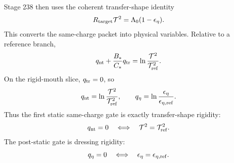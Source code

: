 Stage 238 then uses the coherent transfer-shape identity
\begin{equation}
\label{eq:app-part07-transfer-shape-identity}
R_{\rm target}\mathcal T^2=\Lambda_0(1-\epsilon_\eta).
\end{equation}
This converts the same-charge packet into physical variables.  Relative to a reference branch,
\begin{equation}
\label{eq:app-part07-qnt-transfer-shape}
q_{\rm nt}+\frac{B_*}{C_*}q_{\rm tr}
=
\ln\frac{\mathcal T^2}{\mathcal T_{\rm ref}^2}.
\end{equation}
On the rigid-mouth slice, \(q_{\rm tr}=0\), so
\begin{equation}
\label{eq:app-part07-rm-qnt-qeta-transfer}
q_{\rm nt}=\ln\frac{\mathcal T^2}{\mathcal T_{\rm ref}^2},
\qquad
q_\eta=\ln\frac{\epsilon_\eta}{\epsilon_{\eta,\rm ref}}.
\end{equation}
Thus the first static same-charge gate is exactly transfer-shape rigidity:
\begin{equation}
\label{eq:app-part07-transfer-shape-rigidity}
q_{\rm nt}=0
\quad\Longleftrightarrow\quad
\mathcal T^2=\mathcal T_{\rm ref}^2.
\end{equation}
The post-static gate is dressing rigidity:
\begin{equation}
\label{eq:app-part07-dressing-rigidity}
q_\eta=0
\quad\Longleftrightarrow\quad
\epsilon_\eta=\epsilon_{\eta,\rm ref}.
\end{equation}

